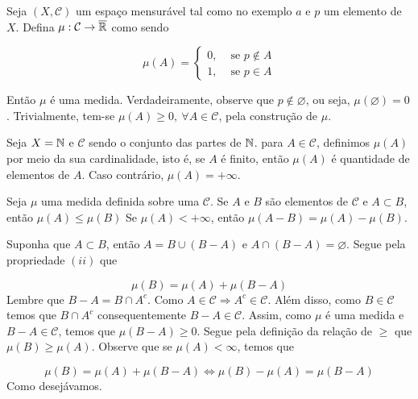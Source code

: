 \begin{example}
\label{ex:medida-concentrada-em-p}
    Seja $(X, \mathcal{C})$ um espaço mensurável tal como no exemplo $a$ e $p$ um elemento de $X$.
    Defina $\mu: \mathcal{C} \to \operatorname{\overline{\mathbb{R}}}$  como sendo


$$\mu(A) = \left\{\begin{array}{cc}
0, & \textrm{\ se \ } p \notin A \\
1, & \textrm{\ se \ } p \in A 
\end{array}\right.$$


Então $\mu$ é uma medida.
Verdadeiramente, observe que $p \notin \varnothing$, ou seja, $\mu(\varnothing) = 0$.
Trivialmente, tem-se $\mu(A) \geq 0,\ \forall A \in \mathcal{C}$, pela construção de $\mu$.



\end{example}

\begin{example}
    Seja $X = \operatorname{\mathbb{N}}$ e $\mathcal{C}$ sendo o conjunto das partes de $\operatorname{\mathbb{N}}$. 
para $A \in \mathcal{C}$, definimos $\mu(A)$ por meio da sua cardinalidade, isto é, se $A$ é finito, então $\mu(A)$ é quantidade de elementos de $A$. Caso contrário, $\mu(A) = +\infty$.

\end{example}





\begin{theorem}
\label{teo:operacoes-com-medidas-1}
	Seja $\mu$ uma medida definida sobre uma \sigal $\mathcal{C}$.
	Se $A$ e $B$ são elementos de $\mathcal{C}$ e $A \subset B$, então $\mu(A) \leq \mu(B)$
	Se $\mu(A) < +\infty$, então $\mu(A-B) = \mu(A) - \mu(B)$.
\end{theorem}

\begin{prova}
	Suponha que $A \subset B$, então $A = B \cup (B - A)$ e $A \cap (B - A) = \varnothing$. Segue pela propriedade $(ii)$ que 
	
	$$\mu(B) = \mu(A) + \mu(B-A)$$
 Lembre que $B-A = B\cap A^c$. Como $A \in \mathcal{C} \Rightarrow A^c \in \mathcal{C}$.
 Além disso, como $B \in \mathcal{C}$ temos que $ B\cap A^c$ consequentemente $B - A \in \mathcal{C}$.
 Assim, como $\mu$ é uma medida e $B-A \in \mathcal{C}$, temos que $\mu(B-A) \geq 0$.
 Segue pela definição da relação de $\geq$ que $\mu(B) \geq \mu(A)$.
 Observe que se $\mu(A) < \infty$, temos que 

	$$\mu(B) = \mu(A) + \mu(B-A) 
 \Leftrightarrow \mu(B) - \mu(A) =  \mu(B-A)
 $$
Como desejávamos.
\end{prova}

